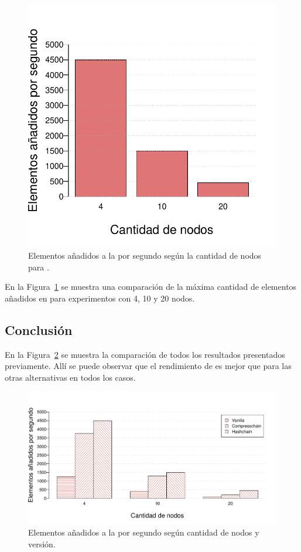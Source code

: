 \begin{figure}
	\centering
	\includegraphics[scale=0.5]{figures/hashchain_results.pdf}
	\caption{Elementos añadidos a la \setchain por segundo según la cantidad de nodos para \hashchain.}
	\label{fig:hashchain_results}
\end{figure}

En la Figura~\ref{fig:hashchain_results} se muestra una comparación de la máxima cantidad de elementos añadidos en \hashchain para experimentos con
4, 10 y 20 nodos.


\subsection{Conclusión}
En la Figura~\ref{fig:resultados_comparados} se muestra la comparación de todos los resultados presentados previamente.
Allí se puede observar que el rendimiento de \hashchain es mejor que para las otras alternativas en todos los casos. 

\begin{figure}
	\centering
	\includegraphics[scale=0.6]{figures/comparativos.pdf}
	\caption{Elementos añadidos a la \setchain por segundo según cantidad de nodos y versión.}
	\label{fig:resultados_comparados}
\end{figure}

